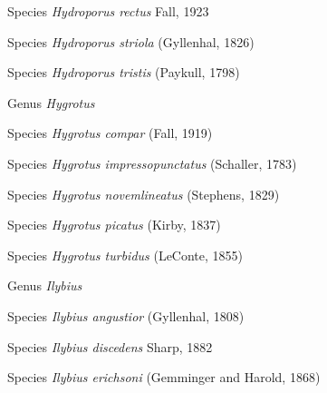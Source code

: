 \documentclass[9pt, article]{memoir}
\begin{document}
\begin{multicols}{2}
\vspace{6pt}\noindent\hspace{36pt}Species \textit{Hydroporus rectus} Fall, 1923


\vspace{6pt}\noindent\hspace{36pt}Species \textit{Hydroporus striola} (Gyllenhal, 1826)


\vspace{6pt}\noindent\hspace{36pt}Species \textit{Hydroporus tristis} (Paykull, 1798)


\vspace{6pt}\noindent\hspace{30pt}Genus \textit{Hygrotus}


\vspace{6pt}\noindent\hspace{36pt}Species \textit{Hygrotus compar} (Fall, 1919)


\vspace{6pt}\noindent\hspace{36pt}Species \textit{Hygrotus impressopunctatus} (Schaller, 1783)


\vspace{6pt}\noindent\hspace{36pt}Species \textit{Hygrotus novemlineatus} (Stephens, 1829)


\vspace{6pt}\noindent\hspace{36pt}Species \textit{Hygrotus picatus} (Kirby, 1837)


\vspace{6pt}\noindent\hspace{36pt}Species \textit{Hygrotus turbidus} (LeConte, 1855)


\vspace{6pt}\noindent\hspace{30pt}Genus \textit{Ilybius}


\vspace{6pt}\noindent\hspace{36pt}Species \textit{Ilybius angustior} (Gyllenhal, 1808)


\vspace{6pt}\noindent\hspace{36pt}Species \textit{Ilybius discedens} Sharp, 1882


\vspace{6pt}\noindent\hspace{36pt}Species \textit{Ilybius erichsoni} (Gemminger and Harold, 1868)



\end{multicols}
\end{document}
